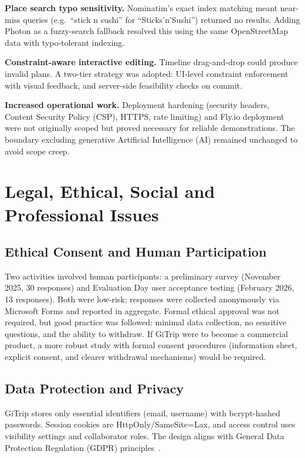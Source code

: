 \documentclass[pdftex,11pt,a4paper,oneside]{article}
\begin{document}
\textbf{Place search typo sensitivity.} Nominatim's exact index matching meant near-miss queries (e.g.\ ``stick n sushi'' for ``Sticks'n'Sushi'') returned no results. Adding Photon as a fuzzy-search fallback resolved this using the same OpenStreetMap data with typo-tolerant indexing.

\textbf{Constraint-aware interactive editing.} Timeline drag-and-drop could produce invalid plans. A two-tier strategy was adopted: UI-level constraint enforcement with visual feedback, and server-side feasibility checks on commit.

\textbf{Increased operational work.} Deployment hardening (security headers, Content Security Policy (CSP), HTTPS, rate limiting) and Fly.io deployment were not originally scoped but proved necessary for reliable demonstrations. The boundary excluding generative Artificial Intelligence (AI) remained unchanged to avoid scope creep.

\section{Legal, Ethical, Social and Professional Issues}

\subsection{Ethical Consent and Human Participation}
Two activities involved human participants: a preliminary survey (November 2025, 30 responses) and Evaluation Day user acceptance testing (February 2026, 13 responses). Both were low-risk; responses were collected anonymously via Microsoft Forms and reported in aggregate. Formal ethical approval was not required, but good practice was followed: minimal data collection, no sensitive questions, and the ability to withdraw. If GiTrip were to become a commercial product, a more robust study with formal consent procedures (information sheet, explicit consent, and clearer withdrawal mechanisms) would be required.

\subsection{Data Protection and Privacy}
GiTrip stores only essential identifiers (email, username) with bcrypt-hashed passwords. Session cookies are HttpOnly/SameSite=Lax, and access control uses visibility settings and collaborator roles. The design aligns with General Data Protection Regulation (GDPR) principles~\cite{ref_gdpr}.
\end{document}
